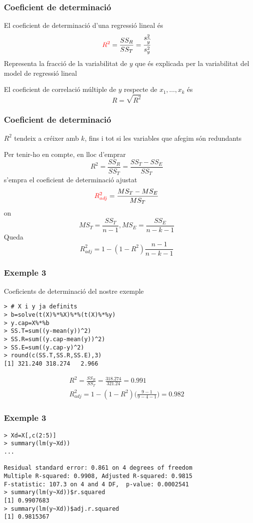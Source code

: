 \documentclass[12pt,t]{beamer}
\newcommand{\red}[1]{\textcolor{red}{#1}}
\renewcommand{\emph}[1]{{\color{red}#1}}
\theoremstyle{plain}
\theoremstyle{definition}
\begin{document}
\begin{frame}
\frametitle{Coeficient de determinació}

El \emph{coeficient de determinació} d'una regressió lineal és
$$
\red{R^2}=\frac{SS_R}{SS_T}=\frac{s^2_{\widehat{y}}}{s^2_y}
$$
Representa la fracció de la variabilitat de $y$ que és explicada
per la variabilitat del model de regressió lineal
\medskip

El \emph{coeficient de correlació múltiple} de  $y$ respecte de $x_1,\ldots, x_k$ és
$$
R=\sqrt{R^2}
$$
\end{frame}


\begin{frame}
\frametitle{Coeficient de determinació}
\vspace*{-2ex}

$R^2$ tendeix a créixer amb $k$, fins i tot si les variables que afegim són redundants
\medskip

Per tenir-ho en compte, en lloc d'emprar
$$
R^2=\frac{SS_R}{SS_T}=\frac{SS_T-SS_E}{SS_T}
$$
s'empra el \emph{coeficient de determinació ajustat}
$$
\red{R^2_{adj}}=\frac{MS_T-MS_E}{MS_T}
$$
on 
$$
MS_T=\frac{SS_T}{n-1}, MS_E=\frac{SS_E}{n-k-1}
$$
Queda
$$
R^2_{adj}=1-(1-R^2)\frac{n-1}{n-k-1}
$$
\end{frame}

\begin{frame}[fragile]
\frametitle{Exemple 3}
\vspace*{-2ex}

Coeficients de determinació del nostre exemple
\begin{verbatim}
> # X i y ja definits
> b=solve(t(X)%*%X)%*%(t(X)%*%y)
> y.cap=X%*%b
> SS.T=sum((y-mean(y))^2)
> SS.R=sum((y.cap-mean(y))^2)
> SS.E=sum((y.cap-y)^2)
> round(c(SS.T,SS.R,SS.E),3)
[1] 321.240 318.274   2.966
\end{verbatim}
{\small $$
\begin{array}{l}
\displaystyle R^2=\frac{SS_R}{SS_T}=\frac{318.274}{321.24}=0.991\\[2ex]
\displaystyle R^2_{adj}=1-(1-R^2)\Big(\frac{9-1}{9-4-1}\Big)=0.982
\end{array}$$

}
\end{frame}

\begin{frame}[fragile]
\frametitle{Exemple 3}
\vspace*{-2ex}

\footnotesize \begin{verbatim}
> Xd=X[,c(2:5)]
> summary(lm(y~Xd))
...

Residual standard error: 0.861 on 4 degrees of freedom
Multiple R-squared: 0.9908,	Adjusted R-squared: 0.9815 
F-statistic: 107.3 on 4 and 4 DF,  p-value: 0.0002541 
> summary(lm(y~Xd))$r.squared
[1] 0.9907683
> summary(lm(y~Xd))$adj.r.squared
[1] 0.9815367
\end{verbatim}
\end{frame}
\end{document}
